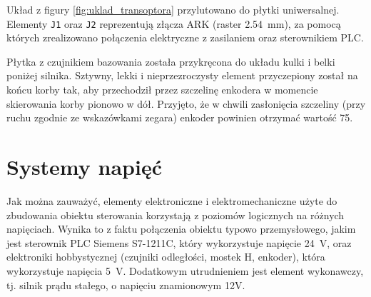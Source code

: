 Układ z figury \ref{fig:uklad_transoptora} przylutowano do płytki uniwersalnej. Elementy \texttt{J1} oraz \texttt{J2} reprezentują złącza ARK (raster \SI{2,54}{\milli\meter}), za pomocą których zrealizowano połączenia elektryczne z zasilaniem oraz sterownikiem PLC.

Płytka z czujnikiem bazowania została przykręcona do układu kulki i belki poniżej silnika. Sztywny, lekki i nieprzezroczysty element przyczepiony został na końcu korby tak, aby przechodził przez szczelinę enkodera w momencie skierowania korby pionowo w dół. Przyjęto, że w chwili zasłonięcia szczeliny (przy ruchu zgodnie ze wskazówkami zegara) enkoder powinien otrzymać wartość 75.

\section{Systemy napięć}
\label{sec:ch3_systemy_napiec}

Jak można zauważyć, elementy elektroniczne i elektromechaniczne użyte do zbudowania obiektu sterowania korzystają z poziomów logicznych na różnych napięciach. Wynika to z faktu połączenia obiektu typowo przemysłowego, jakim jest sterownik PLC Siemens S7-1211C, który wykorzystuje napięcie \SI{24}{\volt}, oraz elektroniki hobbystycznej (czujniki odległości, mostek H, enkoder), która wykorzystuje napięcia \SI{5}{\volt}. Dodatkowym utrudnieniem jest element wykonawczy, tj. silnik prądu stałego, o napięciu znamionowym 12V.

